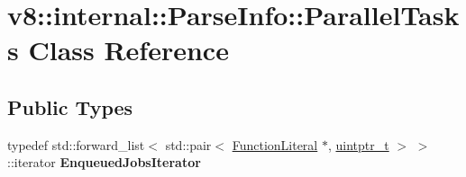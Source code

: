 \hypertarget{classv8_1_1internal_1_1ParseInfo_1_1ParallelTasks}{}\section{v8\+:\+:internal\+:\+:Parse\+Info\+:\+:Parallel\+Tasks Class Reference}
\label{classv8_1_1internal_1_1ParseInfo_1_1ParallelTasks}
\subsection*{Public Types}
\begin{DoxyCompactItemize}
\item 
\mbox{\label{classv8_1_1internal_1_1ParseInfo_1_1ParallelTasks_a18403ad38e77e3561777c927ee418f16}} 
typedef std\+::forward\+\_\+list$<$ std\+::pair$<$ \mbox{\hyperlink{classv8_1_1internal_1_1FunctionLiteral}{Function\+Literal}} $\ast$, \mbox{\hyperlink{classuintptr__t}{uintptr\+\_\+t}} $>$ $>$\+::iterator {\bfseries Enqueued\+Jobs\+Iterator}
\end{DoxyCompactItemize}
